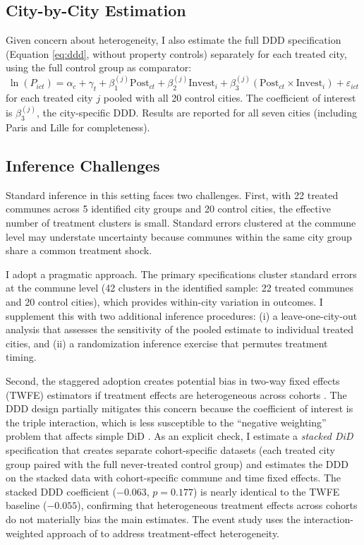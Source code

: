 \documentclass[12pt]{article}
\begin{document}
\subsection{City-by-City Estimation}

Given concern about heterogeneity, I also estimate the full DDD specification (Equation \ref{eq:ddd}, without property controls) separately for each treated city, using the full control group as comparator:
\begin{equation}
\ln(P_{ict}) = \alpha_c + \gamma_t + \beta_1^{(j)} \text{Post}_{ct} + \beta_2^{(j)} \text{Invest}_i + \beta_3^{(j)} (\text{Post}_{ct} \times \text{Invest}_i) + \varepsilon_{ict}
\end{equation}
for each treated city $j$ pooled with all 20 control cities. The coefficient of interest is $\beta_3^{(j)}$, the city-specific DDD. Results are reported for all seven cities (including Paris and Lille for completeness).

\subsection{Inference Challenges}

Standard inference in this setting faces two challenges. First, with 22 treated communes across 5 identified city groups and 20 control cities, the effective number of treatment clusters is small. Standard errors clustered at the commune level may understate uncertainty because communes within the same city group share a common treatment shock.

I adopt a pragmatic approach. The primary specifications cluster standard errors at the commune level (42 clusters in the identified sample: 22 treated communes and 20 control cities), which provides within-city variation in outcomes. I supplement this with two additional inference procedures: (i) a leave-one-city-out analysis that assesses the sensitivity of the pooled estimate to individual treated cities, and (ii) a randomization inference exercise that permutes treatment timing.

Second, the staggered adoption creates potential bias in two-way fixed effects (TWFE) estimators if treatment effects are heterogeneous across cohorts \citep{goodmanbacon2021, dechaisemartin2020two}. The DDD design partially mitigates this concern because the coefficient of interest is the triple interaction, which is less susceptible to the ``negative weighting'' problem that affects simple DiD \citep{callawaysantanna2021}. As an explicit check, I estimate a \emph{stacked DiD} specification that creates separate cohort-specific datasets (each treated city group paired with the full never-treated control group) and estimates the DDD on the stacked data with cohort-specific commune and time fixed effects. The stacked DDD coefficient ($-0.063$, $p = 0.177$) is nearly identical to the TWFE baseline ($-0.055$), confirming that heterogeneous treatment effects across cohorts do not materially bias the main estimates. The event study uses the interaction-weighted approach of \citet{sunandabraham2021} to address treatment-effect heterogeneity.
\end{document}

